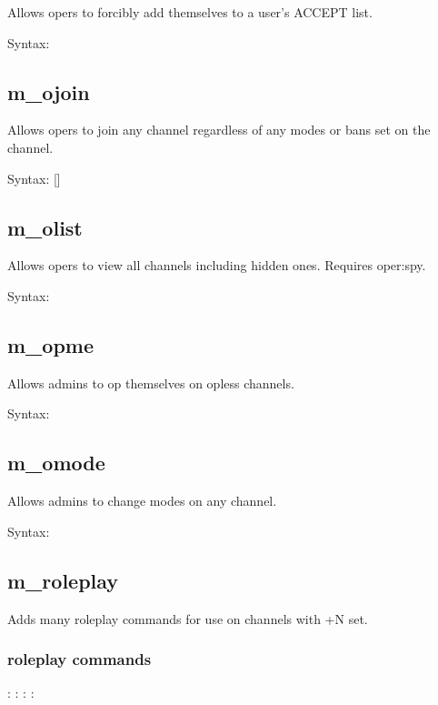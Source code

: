 	Allows opers to forcibly add themselves to a user's ACCEPT list.

	Syntax:  

\subsection{m\_ojoin}

	Allows opers to join any channel regardless of any modes or bans set on the
	channel.

	Syntax:  []

\subsection{m\_olist}

	Allows opers to view all channels including hidden ones. Requires oper:spy.

	Syntax: 

\subsection{m\_opme}

	Allows admins to op themselves on opless channels.

	Syntax:  

\subsection{m\_omode}

	Allows admins to change modes on any channel.

	Syntax:   

\subsection{m\_roleplay}

	Adds many roleplay commands for use on channels with +N set.

	\subsubsection{roleplay commands}
		  
		   :
		   :
		   :
		   :

